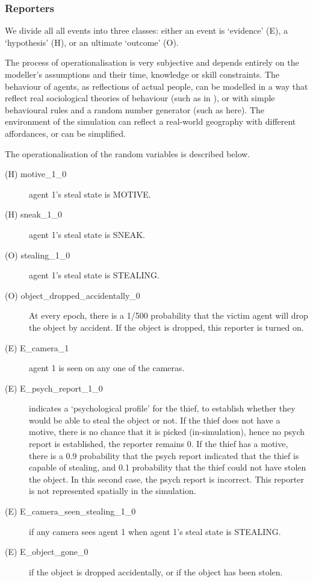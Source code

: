 \documentclass[12pt]{article}
\begin{document}
\subsubsection{Reporters}
We divide all all events into three classes: either an event is `evidence' (E), a `hypothesis' (H), or an ultimate `outcome' (O). 

The process of operationalisation is very subjective and depends entirely on the modeller's assumptions and their time, knowledge or skill constraints. The behaviour of agents, as reflections of actual people, can be modelled in a way that reflect real sociological theories of behaviour (such as in \citet{Gerritsen2015}), or with simple behavioural rules and a random number generator (such as here). The environment of the simulation can reflect a real-world geography with different affordances, or can be simplified. 

The operationalisation of the random variables is described below. 
\begin{description}
\item[(H) motive\_1\_0 ] agent 1's steal state is MOTIVE.
\item[(H) sneak\_1\_0 ] agent 1's steal state is SNEAK.
\item[(O) stealing\_1\_0 ] agent 1's steal state is STEALING.
\item[(O) object\_dropped\_accidentally\_0 ] At every epoch, there is a 1/500 probability that the victim agent will drop the object by accident. If the object is dropped, this reporter is turned on.
\item[(E) E\_camera\_1 ] agent 1 is seen on any one of the cameras.
\item[(E) E\_psych\_report\_1\_0 ] indicates a `psychological profile' for the thief, to establish whether they would be able to steal the object or not. If the thief does not have a motive, there is no chance that it is picked (in-simulation), hence no psych report is established, the reporter remains 0. If the thief has a motive, there is a 0.9 probability that the psych report indicated that the thief is capable of stealing, and 0.1 probability that the thief could not have stolen the object. In this second case, the psych report is incorrect. This reporter is not represented spatially in the simulation.
\item[(E) E\_camera\_seen\_stealing\_1\_0 ]  if any camera sees agent 1 when agent 1's steal state is STEALING.
\item[(E) E\_object\_gone\_0 ] if the object is dropped accidentally, or if the object has been stolen.
\end{description}
\end{document}
